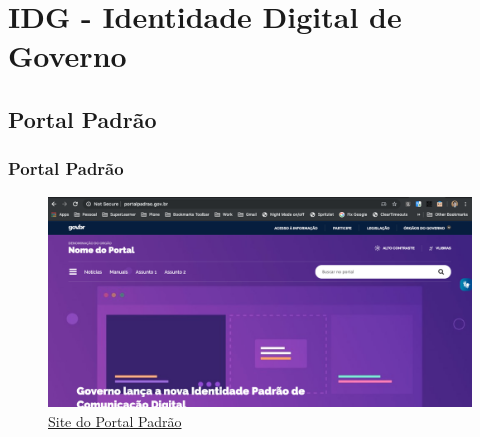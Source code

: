 \documentclass{beamer}
\begin{document}
\section{IDG - Identidade Digital de Governo}
\subsection{Portal Padrão}
\begin{frame}
    \frametitle{Portal Padrão}
    \begin{figure}
        \includegraphics[width=.7\textwidth]{./img/001-007_-_portal_padrao.png}
        \caption{\href{http://www.portalpadrao.gov.br/}{Site do Portal Padrão}}
    \end{figure}
\end{frame}
\end{document}
